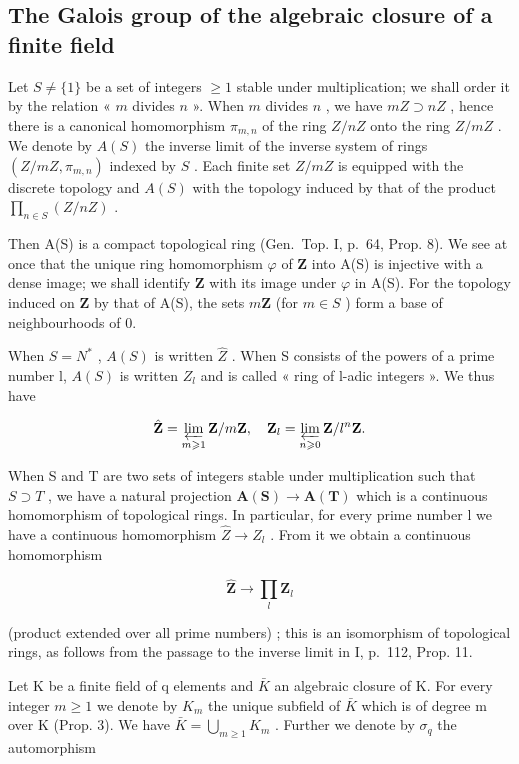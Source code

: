 \subsection{The Galois group of the algebraic closure of a finite field}

Let \(S \neq \{1\}\) be a set of integers \(\geqslant 1\) stable under multiplication; we shall order it by the relation « \(m\) divides \(n\) ». When \(m\) divides \(n\) , we have \(mZ \supset nZ\) , hence there is a canonical homomorphism \(\pi_{m,n}\) of the ring \(Z/nZ\) onto the ring \(Z/mZ\) . We denote by \(A(S)\) the inverse limit of the inverse system of rings \((Z/mZ, \pi_{m,n})\) indexed by \(S\) . Each finite set \(Z/mZ\) is equipped with the discrete topology and \(A(S)\) with the topology induced by that of the product \(\prod_{n \in S} (Z/nZ)\) .

Then A(S) is a compact topological ring (Gen.~Top. I, p.~64, Prop. 8). We see at once that the unique ring homomorphism \(\varphi\) of \(\mathbf{Z}\) into A(S) is injective with a dense image; we shall identify \(\mathbf{Z}\) with its image under \(\varphi\) in A(S). For the topology induced on \(\mathbf{Z}\) by that of A(S), the sets \(m\mathbf{Z}\) (for \(m \in S\) ) form a base of neighbourhoods of 0.

When \(S = N^{*}\) , \(A(S)\) is written \(\hat{Z}\) . When S consists of the powers of a prime number l, \(A(S)\) is written \(Z_{l}\) and is called « ring of l-adic integers ». We thus have

\[
\hat {\mathbf {Z}} = \varprojlim_ {m \geqslant 1} \mathbf {Z} / m \mathbf {Z}, \quad \mathbf {Z} _ {l} = \varprojlim_ {n \geqslant 0} \mathbf {Z} / l ^ {n} \mathbf {Z}.
\]

When S and T are two sets of integers stable under multiplication such that \(S \supset T\) , we have a natural projection \(\mathbf{A}(\mathbf{S}) \to \mathbf{A}(\mathbf{T})\) which is a continuous homomorphism of topological rings. In particular, for every prime number l we have a continuous homomorphism \(\hat{Z} \to Z_{l}\) . From it we obtain a continuous homomorphism

\[
\hat {\mathbf {Z}} \rightarrow \prod_ {l} \mathbf {Z} _ {l}
\]

(product extended over all prime numbers) ; this is an isomorphism of topological rings, as follows from the passage to the inverse limit in I, p.~112, Prop. 11.

Let K be a finite field of q elements and \(\bar{K}\) an algebraic closure of K. For every integer \(m \geqslant 1\) we denote by \(K_{m}\) the unique subfield of \(\bar{K}\) which is of degree m over K (Prop. 3). We have \(\bar{K} = \bigcup_{m \geqslant 1} K_{m}\) . Further we denote by \(\sigma_{q}\) the automorphism

